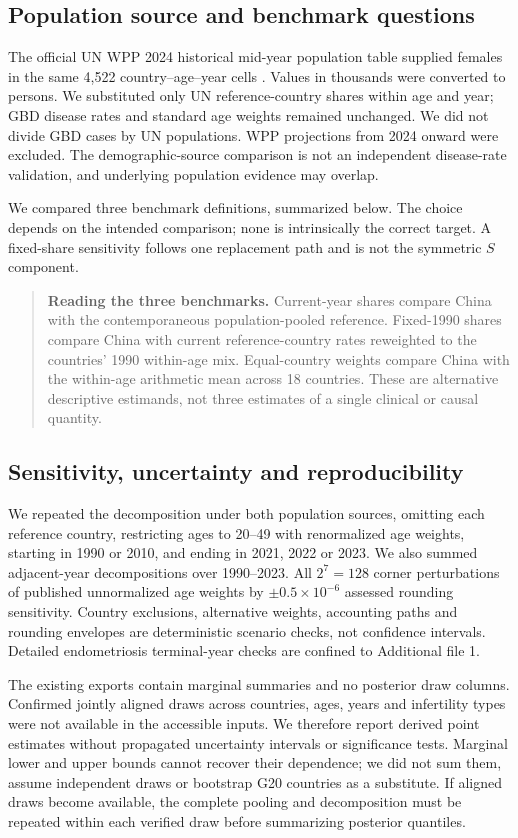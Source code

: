 \documentclass[11pt,a4paper]{article}
\begin{document}
\subsection{Population source and benchmark questions}
The official UN WPP 2024 historical mid-year population table supplied females in the same 4,522 country--age--year cells \cite{wpp2024}. Values in thousands were converted to persons. We substituted only UN reference-country shares within age and year; GBD disease rates and standard age weights remained unchanged. We did not divide GBD cases by UN populations. WPP projections from 2024 onward were excluded. The demographic-source comparison is not an independent disease-rate validation, and underlying population evidence may overlap.

We compared three benchmark definitions, summarized below. The choice depends on the intended comparison; none is intrinsically the correct target. A fixed-share sensitivity follows one replacement path and is not the symmetric $S$ component.

\begin{quote}\small{}
\textbf{Reading the three benchmarks.} Current-year shares compare China with the contemporaneous population-pooled reference. Fixed-1990 shares compare China with current reference-country rates reweighted to the countries' 1990 within-age mix. Equal-country weights compare China with the within-age arithmetic mean across 18 countries. These are alternative descriptive estimands, not three estimates of a single clinical or causal quantity.
\end{quote}

\subsection{Sensitivity, uncertainty and reproducibility}
We repeated the decomposition under both population sources, omitting each reference country, restricting ages to 20--49 with renormalized age weights, starting in 1990 or 2010, and ending in 2021, 2022 or 2023. We also summed adjacent-year decompositions over 1990--2023. All $2^7=128$ corner perturbations of published unnormalized age weights by $\pm0.5\times10^{-6}$ assessed rounding sensitivity. Country exclusions, alternative weights, accounting paths and rounding envelopes are deterministic scenario checks, not confidence intervals. Detailed endometriosis terminal-year checks are confined to Additional file 1.

The existing exports contain marginal summaries and no posterior draw columns. Confirmed jointly aligned draws across countries, ages, years and infertility types were not available in the accessible inputs. We therefore report derived point estimates without propagated uncertainty intervals or significance tests. Marginal lower and upper bounds cannot recover their dependence; we did not sum them, assume independent draws or bootstrap G20 countries as a substitute. If aligned draws become available, the complete pooling and decomposition must be repeated within each verified draw before summarizing posterior quantiles.
\end{document}
